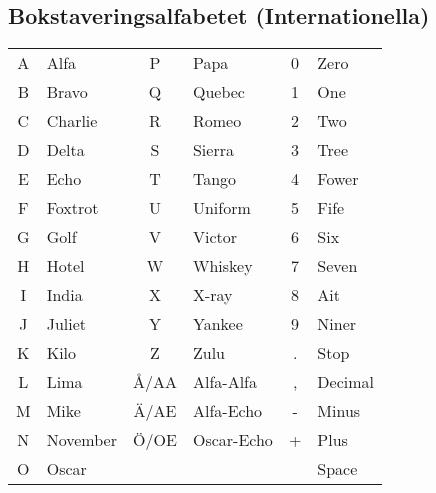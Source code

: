 \subsection{Bokstaveringsalfabetet (Internationella)}
\begin{center}
\begin{tabular}{cl|cl|cl}
	A & Alfa     &  P   & Papa       & 0 & Zero    \\
	B & Bravo    &  Q   & Quebec     & 1 & One     \\
	C & Charlie  &  R   & Romeo      & 2 & Two     \\
	D & Delta    &  S   & Sierra     & 3 & Tree    \\
	E & Echo     &  T   & Tango      & 4 & Fower   \\
	F & Foxtrot  &  U   & Uniform    & 5 & Fife    \\
	G & Golf     &  V   & Victor     & 6 & Six     \\
	H & Hotel    &  W   & Whiskey    & 7 & Seven   \\
	I & India    &  X   & X-ray      & 8 & Ait     \\
	J & Juliet   &  Y   & Yankee     & 9 & Niner   \\
	K & Kilo     &  Z   & Zulu       & . & Stop    \\
	L & Lima     & Å/AA & Alfa-Alfa  & , & Decimal \\
	M & Mike     & Ä/AE & Alfa-Echo  & - & Minus   \\
	N & November & Ö/OE & Oscar-Echo & + & Plus    \\
	O & Oscar    &      &            &   & Space   \\
\end{tabular}
\end{center}

